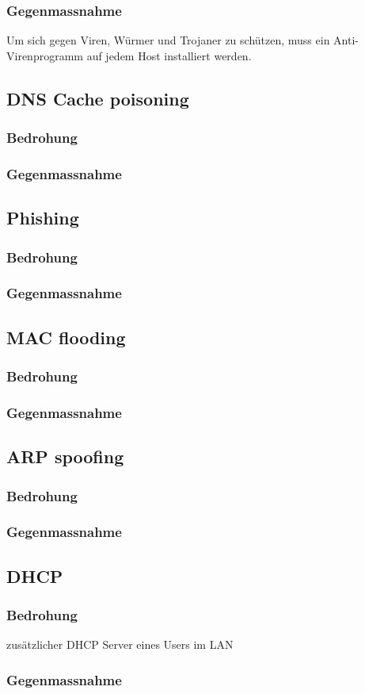 \documentclass[11pt,a4paper,parskip=half]{scrartcl}
\begin{document}
\subsubsection{Gegenmassnahme}
Um sich gegen Viren, Würmer und Trojaner zu schützen, muss ein Anti-Virenprogramm auf jedem Host installiert werden.
\subsection{DNS Cache poisoning}
\subsubsection{Bedrohung}
\subsubsection{Gegenmassnahme}
\subsection{Phishing}
\subsubsection{Bedrohung}
\subsubsection{Gegenmassnahme}
\subsection{MAC flooding}
\subsubsection{Bedrohung}
\subsubsection{Gegenmassnahme}
\subsection{ARP spoofing}
\subsubsection{Bedrohung}
\subsubsection{Gegenmassnahme}
\subsection{DHCP}
\subsubsection{Bedrohung}
zusätzlicher DHCP Server eines Users im LAN
\subsubsection{Gegenmassnahme}
\end{document}
